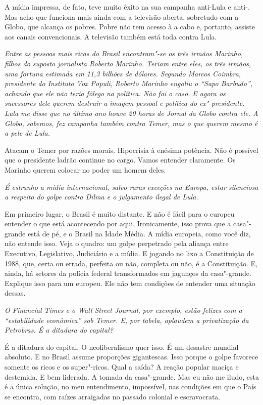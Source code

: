 \normalfont 
A mídia impressa, de fato, teve muito êxito na sua
campanha anti-Lula e anti-. Mas acho que funciona mais ainda com a
televisão aberta, sobretudo com a Globo, que alcança os pobres. Pobre
não tem acesso à  a cabo e, portanto, assiste aos canais
convencionais. A televisão também está toda contra Lula.

\itshape
 Entre as pessoas mais ricas do Brasil encontram"-se os
três irmãos Marinho, filhos do suposto jornalista Roberto Marinho.
Teriam entre eles, os três irmãos, uma fortuna estimada em 11,3 bilhões
de dólares. Segundo Marcos Coimbra, presidente do Instituto Vox Populi,
Roberto Marinho engoliu o ``Sapo Barbudo'', achando que ele não teria
fôlego na política. Não foi o caso. E agora os sucessores dele querem
destruir a imagem pessoal e política do ex"-presidente. Lula me disse que
no último ano houve 20 horas de Jornal da Globo contra ele. A Globo,
sabemos, fez campanha também contra Temer, mas o que querem mesmo é a
pele de Lula.

\normalfont 
Atacam o Temer por razões morais. Hipocrisia à enésima
potência. Não é possível que o presidente ladrão continue no cargo.
Vamos entender claramente. Os Marinho querem colocar no poder um homem
deles.

\itshape
 É estranho a mídia internacional, salvo raras exceções
na Europa, estar silenciosa a respeito do golpe contra Dilma e o
julgamento ilegal de Lula.

\normalfont 
Em primeiro lugar, o Brasil é muito distante. E não é
fácil para o europeu entender o que está acontecendo por aqui.
Ironicamente, isso prova que a casa"-grande está de pé, e o Brasil na
Idade Média. A mídia europeia, como você diz, não entende isso. Veja o
quadro: um golpe perpetrado pela aliança entre Executivo, Legislativo,
Judiciário e a mídia. E jogando no lixo a Constituição de 1988, que,
certa ou errada, perfeita ou não, completa ou não, é a Constituição. E,
ainda, há setores da polícia federal transformados em jagunços da
casa"-grande. Explique isso para um europeu. Ele não tem condições de
entender uma situação dessas.

\itshape
 O \emph{Financial Times} e o \emph{Wall Street
Journal}, por exemplo, estão felizes com a ``estabilidade econômica''
sob Temer. E, por tabela, aplaudem a privatização da Petrobras. É a
ditadura do capital?

\normalfont 
É a ditadura do capital. O neoliberalismo quer isso. É um
desastre mundial absoluto. E no Brasil assume proporções gigantescas.
Isso porque o golpe favorece somente os ricos e os super"-ricos. Qual a
saída? A reação popular maciça e destemida. E bem liderada. A tomada da
casa"-grande. Mas eu não me iludo, esta é a única solução, no meu
entendimento, impossível, nas condições em que o País se encontra, com
raízes arraigadas no passado colonial e escravocrata.

